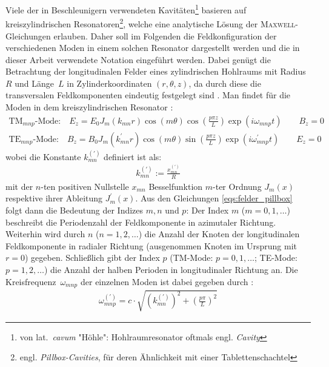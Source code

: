 Viele der in Beschleunigern verwendeten Kavitäten\footnote{von lat.\ \emph{cavum} "Höhle": Hohlraumresonator oftmals engl. \emph{Cavity}} basieren auf kreiszylindrischen Resonatoren\footnote{engl. \emph{Pillbox-Cavities}, für deren Ähnlichkeit mit einer Tablettenschachtel}, welche eine analytische Lösung der \textsc{Maxwell}-Gleichungen erlauben.
Daher soll im Folgenden die Feldkonfiguration der verschiedenen Moden in einem solchen Resonator dargestellt werden und die in dieser Arbeit verwendete Notation eingeführt werden.
Dabei genügt die Betrachtung der longitudinalen Felder eines zylindrischen Hohlraums mit Radius~$R$ und Länge~$L$ in Zylinderkoordinaten $(r, \theta, z)$, da durch diese die transversalen Feldkomponenten eindeutig festgelegt sind \cite[S.\ 4]{hillert}.
Man findet für die Moden in dem kreiszylindrischen Resonator \cite[S. 28-32]{wangler}:
\begin{subequations}
  \begin{align}
  \mathrm{TM}_{mnp}\text{-Mode:} \quad E_z = E_0 J_m(k_{mn} r) \cos(m \theta) \cos\left(\frac{p \pi z}{L}\right) \exp(i \omega_{mnp} t) \qquad B_z = 0\\
  \mathrm{TE}_{mnp}\text{-Mode:} \quad B_z = B_0 J_m(k_{mn}^\prime r) \cos(m \theta) \sin\left(\frac{p \pi z}{L}\right) \exp(i \omega_{mnp}^\prime t) \qquad  E_z = 0
  \end{align}
  \label{eqs:felder_pillbox}
\end{subequations}
wobei die Konstante $k_{mn}^{(\prime)}$ definiert ist als:
\begin{align}
k_{mn}^{(\prime)} := \frac{x_{mn}^{(\prime)}}{R}
\end{align}
mit der $n$-ten positiven Nullstelle $x_{mn}$ Besselfunktion $m$-ter Ordnung $J_m(x)$ respektive ihrer Ableitung $J_m^\prime(x)$.
Aus den Gleichungen \eqref{eqs:felder_pillbox} folgt dann die Bedeutung der Indizes $m, n$ und $p$:
Der Index $m$ ($m=0, 1, \dots$) beschreibt die Periodenzahl der Feldkomponente in azimutaler Richtung.
Weiterhin wird durch $n$ ($n=1, 2, \dots$) die Anzahl der Knoten der longitudinalen Feldkomponente in radialer Richtung (ausgenommen Knoten im Ursprung mit $r=0$) gegeben.
Schließlich gibt der Index $p$ (TM-Mode: $p= 0, 1, \dots$; TE-Mode: $p = 1, 2, \dots$) die Anzahl der halben Perioden in longitudinaler Richtung an.
Die Kreisfrequenz~$\omega_{mnp}$ der einzelnen Moden ist dabei gegeben durch \cite[S.28-32]{wangler}:
\begin{align}
\omega_{mnp}^{(\prime)} = c \cdot \sqrt{\left( k_{mn}^{(\prime)}\right)^2 + \left( \frac{p \pi}{L} \right)^2}
\end{align}

